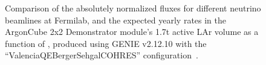 \begin{figure}[htb]
  \centering
  \caption{Comparison of the absolutely normalized fluxes for different neutrino beamlines at Fermilab, and the expected yearly rates in the ArgonCube 2x2 Demonstrator module's 1.7t active LAr volume as a function of \enu, produced using GENIE v2.12.10 with the ``ValenciaQEBergerSehgalCOHRES'' configuration~\cite{genie}.}
  \label{fig:beam_options}
\end{figure}

